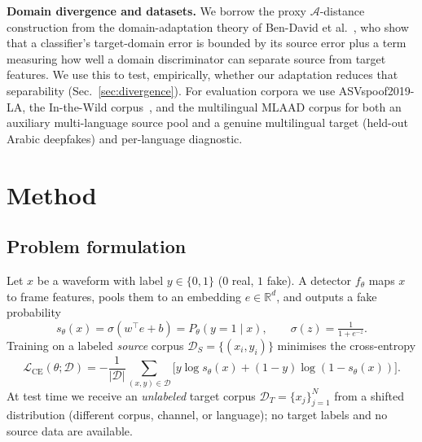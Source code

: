 \documentclass[conference]{IEEEtran}
\begin{document}
\textbf{Domain divergence and datasets.} We borrow the proxy
$\mathcal{A}$-distance construction from the domain-adaptation
theory of Ben-David et al.~\cite{bendavid}, who show that a classifier's
target-domain error is bounded by its source error plus a term measuring how
well a domain discriminator can separate source from target features. We use
this to test, empirically, whether our adaptation reduces that separability
(Sec.~\ref{sec:divergence}). For evaluation corpora we use ASVspoof2019-LA, the
In-the-Wild corpus~\cite{itw}, and the multilingual MLAAD corpus for both an
auxiliary multi-language source pool and a genuine multilingual target
(held-out Arabic deepfakes) and per-language diagnostic.

\section{Method}
\subsection{Problem formulation}
Let $x$ be a waveform with label $y\in\{0,1\}$ ($0$ real, $1$ fake). A detector
$f_\theta$ maps $x$ to frame features, pools them to an embedding
$e\in\mathbb{R}^{d}$, and outputs a fake probability
\begin{equation}
s_\theta(x)=\sigma\!\left(w^\top e+b\right)=P_\theta(y{=}1\mid x),\qquad \sigma(z)=\tfrac{1}{1+e^{-z}} .
\end{equation}
Training on a labeled \emph{source} corpus $\mathcal{D}_S=\{(x_i,y_i)\}$ minimises
the cross-entropy
\begin{equation}
\mathcal{L}_{\mathrm{CE}}(\theta;\mathcal{D})=-\frac{1}{|\mathcal{D}|}\!\!\sum_{(x,y)\in\mathcal{D}}\!\!
\big[y\log s_\theta(x)+(1{-}y)\log(1{-}s_\theta(x))\big].
\end{equation}
At test time we receive an \emph{unlabeled} target corpus
$\mathcal{D}_T=\{x_j\}_{j=1}^{N}$ from a shifted distribution (different corpus,
channel, or language); no target labels and no source data are available.
\end{document}
